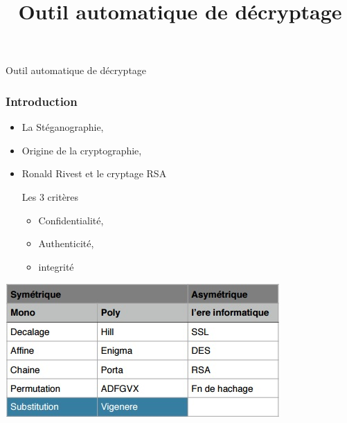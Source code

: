 \documentclass[10pt,xcolor=table]{beamer}
\title{Outil automatique de décryptage}
\begin{document}
\begin{frame}
\begin{center}
\Huge {Outil automatique de décryptage}
\end{center}
\end{frame}


\begin{frame}
  \frametitle{Introduction}

  \begin{itemize}[<+->]
  \item La Stéganographie,
  \item Origine de la cryptographie,
  \item Ronald Rivest et le cryptage RSA
  
  \begin{block}{Les 3 critères}
    \begin{itemize}
    \item Confidentialité,
    \item Authenticité,
    \item integrité
    \end{itemize}
  \end{block}
  \end{itemize}
  \pause
  \begin{center}\includegraphics[scale=0.4]{Tab1.jpg}\end{center}

\end{frame}
\end{document}
